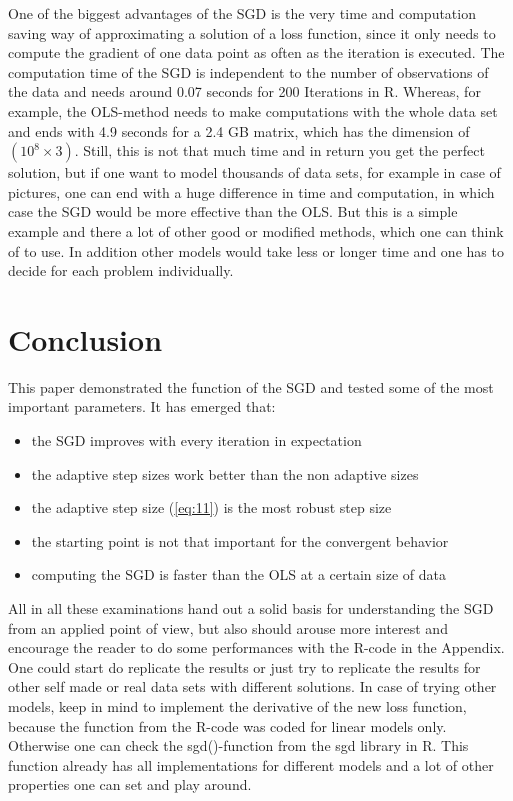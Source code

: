 \documentclass{article}
\begin{document}
One of the biggest advantages of the SGD is the very time and computation saving way of approximating a solution of a loss function, since it only needs to compute the gradient of one data point as often as the iteration is executed. The computation time of the SGD is independent to the number of observations of the data and needs around 0.07 seconds for 200 Iterations in R. Whereas, for example, the OLS-method needs to make computations with the whole data set and ends with 4.9 seconds for a 2.4 GB matrix, which has the dimension of $(10^8 \times 3)$. Still, this is not that much time and in return you get the perfect solution, but if one want to model thousands of data sets, for example in case of pictures, one can end with a huge difference in time and computation, in which case the SGD would be more effective than the OLS. But this is a simple example and there a lot of other good or modified methods, which one can think of to use. In addition other models would take less or longer time and one has to decide for each problem individually. 

\section{Conclusion}
This paper demonstrated the function of the SGD and tested some of the most important parameters. It has emerged that: 
\begin{itemize}
\item the SGD improves with every iteration in expectation
\item the adaptive step sizes work better than the non adaptive sizes
\item the adaptive step size (\ref{eq:11}) is the most robust step size
\item the starting point is not that important for the convergent behavior
\item computing the SGD is faster than the OLS at a certain size of data

\end{itemize}
All in all these examinations hand out a solid basis for understanding the SGD from an applied point of view, but also should arouse more interest and encourage the reader to do some performances with the R-code in the Appendix. One could start do replicate the results or just try to replicate the results for other self made or real data sets with different solutions. In case of trying other models, keep in mind to implement the derivative of the new loss function, because the function from the R-code was coded for linear models only. Otherwise one can check the sgd()-function from the sgd library in R. This function already has all implementations for different models and a lot of other properties one can set and play around. 
\end{document}
